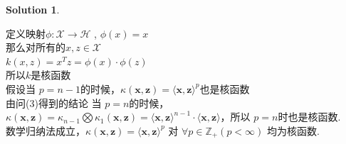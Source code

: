 \documentclass[a4paper,UTF8]{article}
\numberwithin{equation}{section}
\theoremstyle{definition}
\newtheorem*{solution}{Solution}
\def \x {\mathbf{x}}
\def \z {\mathbf{z}}
\begin{document}
\begin{solution}
\begin{enumerate}
	定义映射$\phi: \mathcal{X} \rightarrow \mathcal{H}$ ,
	$\phi (x) = x$ \\
	那么对所有的$x,z\in \mathcal{X}$\\
	$k(x, z) = x^{T}z = \phi (x)\cdot\phi (z)$\\
	所以$k$是核函数\\
	假设当 $p=n-1$的时候，$\kappa(\x,\z) = \langle \x, \z\rangle^p $也是核函数 \\
	由问(3)得到的结论
	当 $p=n$的时候，$\kappa(\x,\z) = \kappa_{n-1} \bigotimes \kappa_1 (\x,\z) = \langle \x, \z\rangle^{n-1} \cdot \langle \x, \z\rangle $，所以 $p=n$时也是核函数. \\
	数学归纳法成立，$\kappa(\x, \z) = \langle\x, \z\rangle^p$ 对 $\forall p\in\mathbb{Z}_+(p<\infty)$ 均为核函数.
\end{enumerate}
\end{solution}
\end{document}
